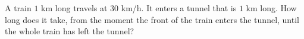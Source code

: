 A train $1$ km long travels at $30$ km/h. It enters a tunnel that is $1$ km long. How long does it take, from the moment the front of the train enters the tunnel, until the whole train has left the tunnel?

